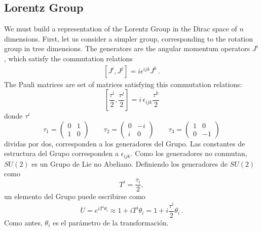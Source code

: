 \subsection{Lorentz Group}
We must build a representation of the Lorentz Group in the Dirac space of $n$ dimensions. First, let us consider a simpler group, corresponding to the rotation group in tree dimensions. The generators are the angular momentum operators $J^i$, which satisfy the commutation relations
\begin{align}
\label{eq:rotgr}
  \left[J^i,J^j\right]=i\epsilon^{ijk}J^k\,.
\end{align}
The Pauli matrices are set of matrices satisfying this commutation relations:
\begin{equation}
  \label{eq:paulialg}
  \left[\frac{\tau^i}{2},\frac{\tau^j}{2} \right]=i\,\epsilon_{ijk}\frac{\tau^k}{2}
\end{equation}
donde $\tau^i$ 
\begin{equation}
  \label{eq:paulimatr}
  \tau_1=
  \begin{pmatrix}
    0&1\\
    1&0
  \end{pmatrix} \qquad
 \tau_2=
  \begin{pmatrix}
    0&-i\\
    i&0
  \end{pmatrix}\qquad 
 \tau_3=
  \begin{pmatrix}
    1&0\\
    0&-1
  \end{pmatrix}
 \end{equation}
dividas por dos, corresponden a los generadores del Grupo. Las constantes de estructura del Grupo corresponden a $\epsilon_{ijk}$. Como los generadores no conmutan, $SU(2)$ es un Grupo de Lie no Abeliano. Definiendo los generadores de $SU(2)$ como
\begin{equation}
  T^i=\frac{\tau_i}{2},
\end{equation}
un elemento del Grupo puede escribirse como
\begin{equation}
  \label{eq:63qft}
  U=e^{iT^i \theta_i }\approx1+iT^i\theta_i=1+i\frac{\tau^i}{2}\theta_i\,.
\end{equation}
Como antes, $\theta_i$ es el parámetro de la transformación. 


